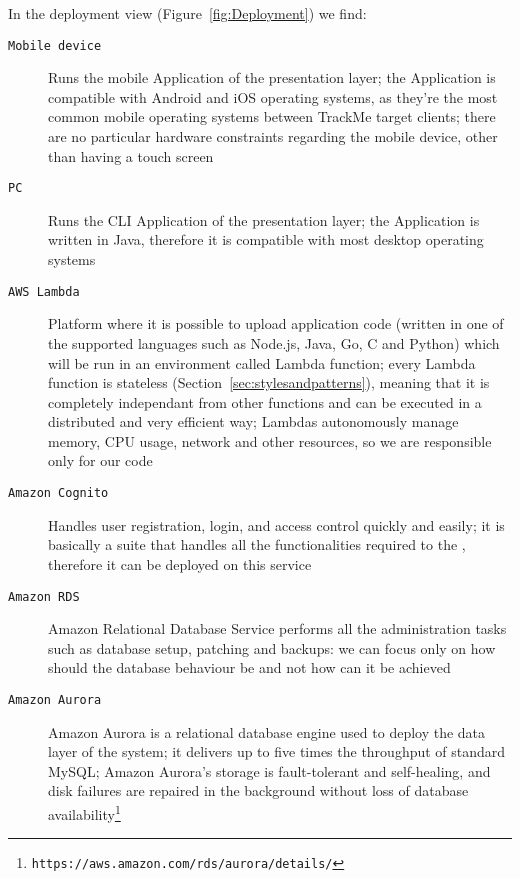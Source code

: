 \documentclass[../DD0.tex]{subfiles}
\begin{document}
    In the deployment view (Figure~\ref{fig:Deployment}) we find:
    \begin{description}
      \item[\texttt{Mobile device}] Runs the mobile Application of the presentation layer; the Application is compatible with Android and iOS operating systems, as they're the most common mobile operating systems between TrackMe target clients; there are no particular hardware constraints regarding the mobile device, other than having a touch screen

      \item[\texttt{PC}] Runs the CLI Application of the presentation layer; the Application is written in Java, therefore it is compatible with most desktop operating systems

      \item[\texttt{AWS Lambda}] Platform where it is possible to upload application code (written in one of the supported languages such as Node.js, Java, Go, C and Python) which will be run in an environment called Lambda function; every Lambda function is stateless (Section~\ref{sec:stylesandpatterns}), meaning that it is completely independant from other functions and can be executed in a distributed and very efficient way; Lambdas autonomously manage memory, CPU usage, network and other resources, so we are responsible only for our code

      \item[\texttt{Amazon Cognito}] Handles user registration, login, and access control quickly and easily; it is basically a suite that handles all the functionalities required to the \AccountManager, therefore it can be deployed on this service

      \item[\texttt{Amazon RDS}] Amazon Relational Database Service performs all the administration tasks such as database setup, patching and backups: we can focus only on how should the database behaviour be and not how can it be achieved

      \item[\texttt{Amazon Aurora}] Amazon Aurora is a relational database engine used to deploy the data layer of the system; it delivers up to five times the throughput of standard MySQL; Amazon Aurora's storage is fault-tolerant and self-healing, and disk failures are repaired in the background without loss of database availability\footnote{\texttt{https://aws.amazon.com/rds/aurora/details/}}
    \end{description}
\end{document}
